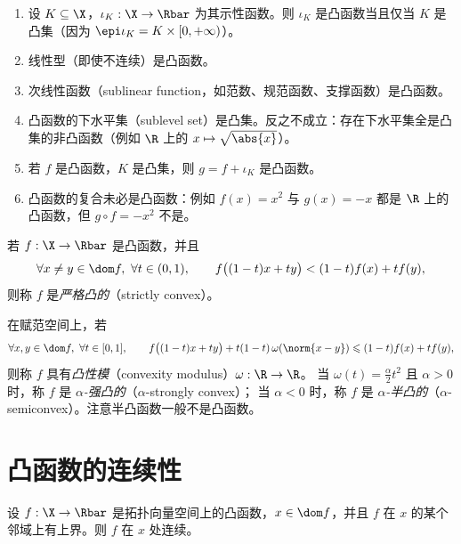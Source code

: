\begin{example}
\label{exa:5}
\begin{enumerate}[label=\alph*.]
  \item 设 $K\subseteq\X$，$\iota_K:\X\to\Rbar$ 为其示性函数。则 $\iota_K$ 是凸函数当且仅当 $K$ 是凸集（因为 $\epi\iota_K=K\times[0,+\infty)$）。
  \item 线性型（即使不连续）是凸函数。
  \item 次线性函数（sublinear function，如范数、规范函数、支撑函数）是凸函数。
  \item 凸函数的下水平集（sublevel set）是凸集。反之不成立：存在下水平集全是凸集的非凸函数（例如 $\R$ 上的 $x\mapsto\sqrt{\abs{x}}$）。
  \item 若 $f$ 是凸函数，$K$ 是凸集，则 $g=f+\iota_K$ 是凸函数。
  \item 凸函数的复合未必是凸函数：例如 $f(x)=x^2$ 与 $g(x)=-x$ 都是 $\R$ 上的凸函数，但 $g\circ f=-x^2$ 不是。
\end{enumerate}
\end{example}

\begin{definition}
\label{def:13}
若 $f:\X\to\Rbar$ 是凸函数，并且
\begin{equation}
  \label{eq:5}
  \forall x\neq y\in\dom f,\ \forall t\in(0,1),\qquad
  f\bigl((1-t)x+ty\bigr)<(1-t)f(x)+tf(y),
\end{equation}
则称 $f$ 是\emph{严格凸的}（strictly convex）。

在赋范空间上，若
\begin{equation}
  \label{eq:6}
  \forall x,y\in\dom f,\ \forall t\in[0,1],\qquad
  f\bigl((1-t)x+ty\bigr)+t(1-t)\,\omega(\norm{x-y})\leqslant(1-t)f(x)+tf(y),
\end{equation}
则称 $f$ 具有\emph{凸性模}（convexity modulus）$\omega:\R\to\R$。
当 $\omega(t)=\frac{\alpha}{2}t^2$ 且 $\alpha>0$ 时，称 $f$ 是 \emph{$\alpha$-强凸的}（$\alpha$-strongly convex）；
当 $\alpha<0$ 时，称 $f$ 是 \emph{$\alpha$-半凸的}（$\alpha$-semiconvex）。注意半凸函数一般不是凸函数。
\end{definition}

\section{凸函数的连续性}

\begin{proposition}
\label{res:17}
设 $f:\X\to\Rbar$ 是拓扑向量空间上的凸函数，$x\in\dom f$，并且 $f$ 在 $x$ 的某个邻域上有上界。则 $f$ 在 $x$ 处连续。
\end{proposition}

